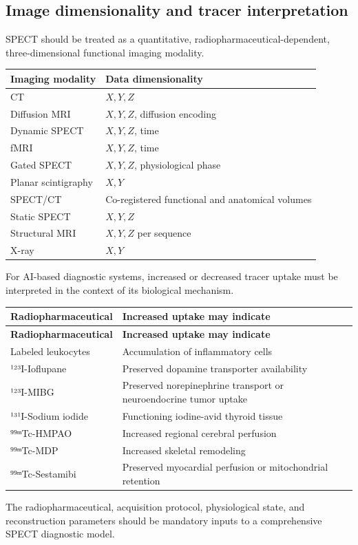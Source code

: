\subsection{Image dimensionality and tracer interpretation}
SPECT should be treated as a quantitative, radiopharmaceutical-dependent, three-dimensional functional imaging modality.
\begin{center}
\begin{tabular}{@{}ll@{}}
\toprule
\textbf{Imaging modality} & \textbf{Data dimensionality} \\
\midrule
CT & $X, Y, Z$ \\
Diffusion MRI & $X, Y, Z$, diffusion encoding \\
Dynamic SPECT & $X, Y, Z$, time \\
fMRI & $X, Y, Z$, time \\
Gated SPECT & $X, Y, Z$, physiological phase \\
Planar scintigraphy & $X, Y$ \\
SPECT/CT & Co-registered functional and anatomical volumes \\
Static SPECT & $X, Y, Z$ \\
Structural MRI & $X, Y, Z$ per sequence \\
X-ray & $X, Y$ \\
\bottomrule
\end{tabular}
\end{center}

For AI-based diagnostic systems, increased or decreased tracer uptake must be interpreted in the context of its biological mechanism.
\begin{longtable}{@{}p{}p{}@{}}
\toprule
\textbf{Radiopharmaceutical} & \textbf{Increased uptake may indicate} \\
\midrule
\endfirsthead
\toprule
\textbf{Radiopharmaceutical} & \textbf{Increased uptake may indicate} \\
\midrule
\endhead
Labeled leukocytes & Accumulation of inflammatory cells \\
¹²³I-Ioflupane & Preserved dopamine transporter availability \\
¹²³I-MIBG & Preserved norepinephrine transport or neuroendocrine tumor uptake \\
¹³¹I-Sodium iodide & Functioning iodine-avid thyroid tissue \\
⁹⁹ᵐTc-HMPAO & Increased regional cerebral perfusion \\
⁹⁹ᵐTc-MDP & Increased skeletal remodeling \\
⁹⁹ᵐTc-Sestamibi & Preserved myocardial perfusion or mitochondrial retention \\
\bottomrule
\end{longtable}

The radiopharmaceutical, acquisition protocol, physiological state, and reconstruction parameters should be mandatory inputs to a comprehensive SPECT diagnostic model. 

